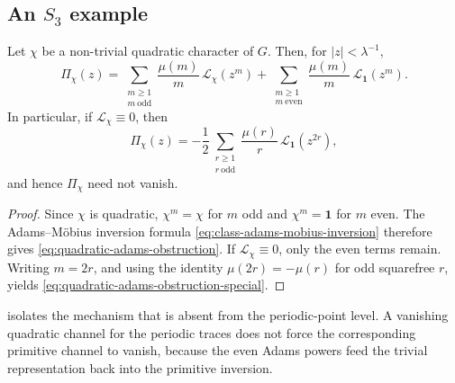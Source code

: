 \subsection{An \texorpdfstring{$S_3$}{S3} example}

\begin{proposition}
  \label{thm:quadratic-adams-obstruction}
  Let \(\chi\) be a non-trivial quadratic character of \(G\). Then, for
  \(|z|<\lambda^{-1}\),
  \begin{equation}\label{eq:quadratic-adams-obstruction}
    \Pi_\chi(z)
    =
    \sum_{\substack{m\ge 1\\ m\ \mathrm{odd}}}
      \frac{\mu(m)}{m}\,\mathcal L_\chi(z^m)
    +
    \sum_{\substack{m\ge 1\\ m\ \mathrm{even}}}
      \frac{\mu(m)}{m}\,\mathcal L_{\mathbf 1}(z^m).
  \end{equation}
  In particular, if \(\mathcal L_\chi\equiv 0\), then
  \begin{equation}\label{eq:quadratic-adams-obstruction-special}
    \Pi_\chi(z)
    =
    -\frac{1}{2}
      \sum_{\substack{r\ge 1\\ r\ \mathrm{odd}}}
        \frac{\mu(r)}{r}\,
        \mathcal L_{\mathbf 1}(z^{2r}),
  \end{equation}
  and hence \(\Pi_\chi\) need not vanish.
\end{proposition}

\begin{proof}
  Since \(\chi\) is quadratic, \(\chi^m=\chi\) for \(m\) odd and
  \(\chi^m=\mathbf 1\) for \(m\) even. The Adams--M\"obius inversion
  formula \eqref{eq:class-adams-mobius-inversion} therefore gives
  \eqref{eq:quadratic-adams-obstruction}. If \(\mathcal L_\chi\equiv 0\),
  only the even terms remain. Writing \(m=2r\), and using the identity
  \(\mu(2r)=-\mu(r)\) for odd squarefree \(r\), yields
  \eqref{eq:quadratic-adams-obstruction-special}.
\end{proof}

\begin{remark}
   isolates the mechanism that is
  absent from the periodic-point level. A vanishing quadratic channel
  for the periodic traces does not force the corresponding primitive
  channel to vanish, because the even Adams powers feed the trivial
  representation back into the primitive inversion.
\end{remark}

